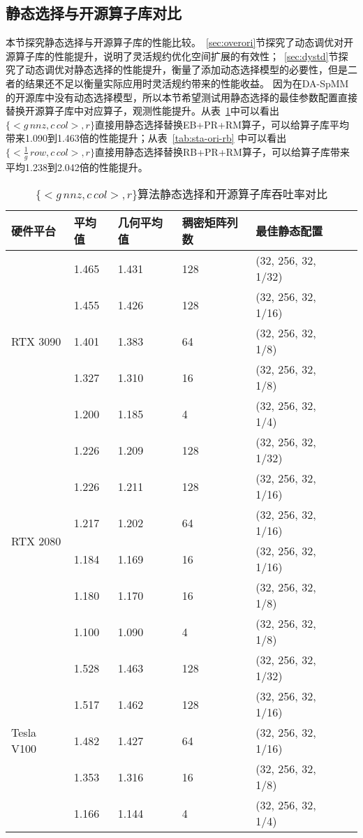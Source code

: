 \subsection{静态选择与开源算子库对比}
本节探究静态选择与开源算子库的性能比较。~\ref{sec:overori}节探究了动态调优对开源算子库的性能提升，说明了灵活规约优化空间扩展的有效性；~\ref{sec:dystd}节探究了动态调优对静态选择的性能提升，衡量了添加动态选择模型的必要性，但是二者的结果还不足以衡量实际应用时灵活规约带来的性能收益。
因为在DA-SpMM的开源库中没有动态选择模型，所以本节希望测试用静态选择的最佳参数配置直接替换开源算子库中对应算子，观测性能提升。从表~\ref{tab:sta-ori-eb}中可以看出$\{<g\,nnz , c\,col>,r\}$直接用静态选择替换EB+PR+RM算子，可以给算子库平均带来1.090到1.463倍的性能提升；从表~\ref{tab:sta-ori-rb}
中可以看出$\{<\frac{1}{g}\,row , c\,col>,r\}$直接用静态选择替换RB+PR+RM算子，可以给算子库带来平均1.238到2.042倍的性能提升。
\begin{table}
  \centering
  \caption{$\{<g\,nnz , c\,col>,r\}$算法静态选择和开源算子库吞吐率对比}
  \begin{tabular}{llllll}
  \toprule
  硬件平台 & 平均值 & 几何平均值  & 稠密矩阵列数 & 最佳静态配置 \\
  \midrule
  \multirow{5}{*}{RTX 3090}& 1.465 & 1.431  & 128 & (32, 256, 32, 1/32)\\
                           & 1.455 & 1.426  & 128 & (32, 256, 32, 1/16)\\
                           & 1.401 & 1.383  & 64 & (32, 256, 32, 1/8)\\
                           & 1.327 & 1.310  & 16 & (32, 256, 32, 1/8)\\
                           & 1.200 & 1.185  & 4 & (32, 256, 32, 1/4)\\
  \hline
  \multirow{6}{*}{RTX 2080}& 1.226 & 1.209 & 128 & (32, 256, 32, 1/32)\\
                           & 1.226 & 1.211 & 128 & (32, 256, 32, 1/16)\\
                           & 1.217 & 1.202 & 64 & (32, 256, 32, 1/16)\\
                           & 1.184 & 1.169 & 16 & (32, 256, 32, 1/16)\\
                           & 1.180 & 1.170  & 16& (32, 256, 32, 1/8)\\
                           & 1.100 & 1.090  & 4 & (32, 256, 32, 1/8)\\
  \hline
  \multirow{5}{*}{Tesla V100}& 1.528 & 1.463 & 128 & (32, 256, 32, 1/32)\\
                             & 1.517 & 1.462 & 128 & (32, 256, 32, 1/16)\\
                             & 1.482 & 1.427  & 64 & (32, 256, 32, 1/16)\\
                             & 1.353 & 1.316  & 16 & (32, 256, 32, 1/8)\\
                             & 1.166 & 1.144  & 4 & (32, 256, 32, 1/4)\\
  \bottomrule
  \end{tabular}
  \label{tab:sta-ori-eb}
\end{table}
